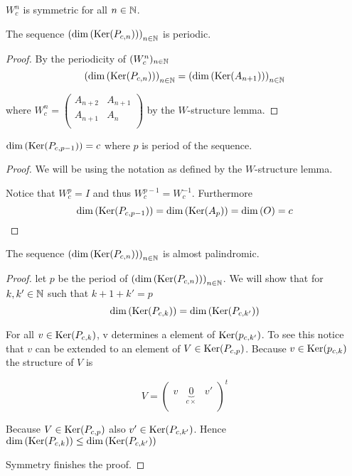 \begin{corollary}
  $W_{c}^{n}$ is symmetric for all $n\in\mathbb{N}$.
\end{corollary}

\begin{proposition}
  The sequence $\left(\dim\left(\operatorname{Ker}(P_{c,n})\right)\right)_{n\in\mathbb{N}}$
  is periodic.
\end{proposition}

\begin{proof}
  By the periodicity of $(W_{c}^{n})_{n\in\mathbb{N}}$
  \[
  \left(\dim\left(\operatorname{Ker}(P_{c,n})\right)\right)_{n\in\mathbb{N}} 
  = 
  \left(\dim\left(\operatorname{Ker}(A_{n+1})\right)\right)_{n\in\mathbb{N}}
  \]

  where $W_{c}^{n}=\left(\begin{smallmatrix} A_{n+2} & A_{n+1}  \\ A_{n+1} & A_{n} \\\end{smallmatrix}\right)$
  by the $W$-structure lemma.
\end{proof}

\begin{lemma}
  $\dim\left(\operatorname{Ker}(P_{c,p-1})\right) = c$ where $p$ is period of the sequence. 
\end{lemma}

\begin{proof}
  We will be using the notation as defined by the $W$-structure lemma.

  Notice that $W_{c}^{p} = I$ and thus $W_{c}^{p-1} = W_{c}^{-1}$.
  Furthermore
  \[
  \dim\left(\operatorname{Ker}(P_{c,p-1})\right)
  =
  \dim\left(\operatorname{Ker}(A_{p})\right) = \dim\left(O\right)
  = c
  \]
\end{proof}

\begin{theorem}
  The sequence $\left(\dim\left(\operatorname{Ker}(P_{c,n})\right)\right)_{n\in\mathbb{N}}$
  is almost palindromic.
\end{theorem}

\begin{proof}
  let $p$ be the period of
  $\left(\dim\left(\operatorname{Ker}(P_{c,n})\right)\right)_{n\in\mathbb{N}}$. We will show
  that for $k,k'\in\mathbb{N}$ such that $k+1+k'=p$
  \[
  \dim\left(\operatorname{Ker}(P_{c,k})\right) = \dim\left(\operatorname{Ker}(P_{c,k'})\right)
  \]

  For all $v\in\operatorname{Ker}(P_{c,k})$, v determines a element of
  $\operatorname{Ker}(p_{c,k'})$. To see this notice that $v$ can be extended to an
  element of $V\in\operatorname{Ker}(P_{c,p})$. Because $v\in\operatorname{Ker}(p_{c,k})$ the
  structure of $V$ is
  
  \[
  V =
  \left(
  \begin{array}{ccc}
    v & \underbrace{0}_{c\times} & v' \\
  \end{array}
  \right)^{t}
  \]
  
  Because $V\in\operatorname{Ker}(P_{c,p})$ also
  $v'\in\operatorname{Ker}(P_{c,k'})$. Hence  $\dim\left(\operatorname{Ker}(P_{c,k})\right) \le
  \dim\left(\operatorname{Ker}(P_{c,k'})\right)$ 

  Symmetry finishes the proof.
\end{proof}
